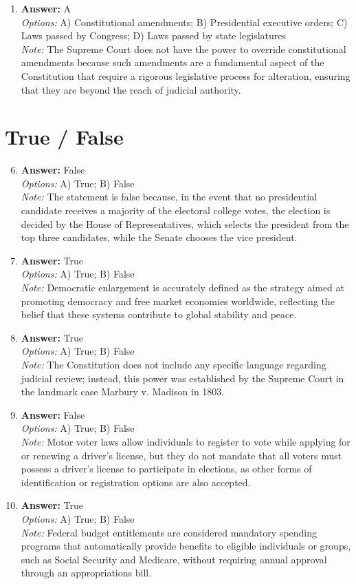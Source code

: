 \documentclass[12pt]{article}
\begin{document}
\begin{enumerate}[label=\arabic*.]
\item \textbf{Answer:} A
\\ \textit{Options:} A) Constitutional amendments; B) Presidential executive orders; C) Laws passed by Congress; D) Laws passed by state legislatures
\\ \textit{Note:} The Supreme Court does not have the power to override constitutional amendments because such amendments are a fundamental aspect of the Constitution that require a rigorous legislative process for alteration, ensuring that they are beyond the reach of judicial authority.
\end{enumerate}

\section*{True / False}
\begin{enumerate}[label=\arabic*.]
\setcounter{enumi}{5}
\item \textbf{Answer:} False
\\ \textit{Options:} A) True; B) False
\\ \textit{Note:} The statement is false because, in the event that no presidential candidate receives a majority of the electoral college votes, the election is decided by the House of Representatives, which selects the president from the top three candidates, while the Senate chooses the vice president.
\item \textbf{Answer:} True
\\ \textit{Options:} A) True; B) False
\\ \textit{Note:} Democratic enlargement is accurately defined as the strategy aimed at promoting democracy and free market economies worldwide, reflecting the belief that these systems contribute to global stability and peace.
\item \textbf{Answer:} True
\\ \textit{Options:} A) True; B) False
\\ \textit{Note:} The Constitution does not include any specific language regarding judicial review; instead, this power was established by the Supreme Court in the landmark case Marbury v. Madison in 1803.
\item \textbf{Answer:} False
\\ \textit{Options:} A) True; B) False
\\ \textit{Note:} Motor voter laws allow individuals to register to vote while applying for or renewing a driver's license, but they do not mandate that all voters must possess a driver's license to participate in elections, as other forms of identification or registration options are also accepted.
\item \textbf{Answer:} True
\\ \textit{Options:} A) True; B) False
\\ \textit{Note:} Federal budget entitlements are considered mandatory spending programs that automatically provide benefits to eligible individuals or groups, such as Social Security and Medicare, without requiring annual approval through an appropriations bill.
\end{enumerate}
\end{document}
